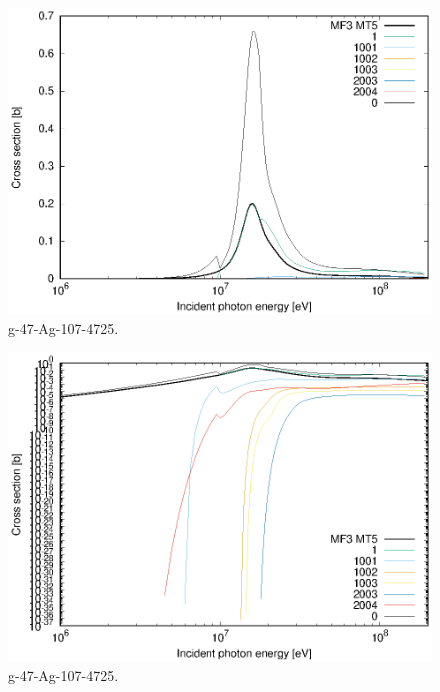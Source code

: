 \begin{figure}
 \includegraphics[width=\linewidth]{eps/g_47-Ag-107_4725.eps}
  \caption{g-47-Ag-107-4725.}
\end{figure}
\begin{figure}
 \includegraphics[width=\linewidth]{eps-log/g_47-Ag-107_4725.eps}
 \caption{g-47-Ag-107-4725.}
\end{figure}
\newpage \clearpage

